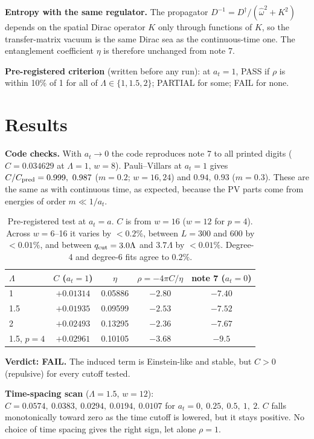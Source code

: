 \documentclass[11pt]{article}
\begin{document}
\textbf{Entropy with the same regulator.} The propagator $D^{-1}=D^\dagger/(\hat\omega^2+K^2)$ depends on the spatial Dirac operator $K$ only through functions of $K$, so the transfer-matrix vacuum is the same Dirac sea as the continuous-time one. The entanglement coefficient $\eta$ is therefore unchanged from note 7.

\textbf{Pre-registered criterion} (written before any run): at $a_t=1$, PASS if $\rho$ is within 10\% of 1 for all of $\Lambda\in\{1,1.5,2\}$; PARTIAL for some; FAIL for none.

\section{Results}
\textbf{Code checks.} With $a_t\to0$ the code reproduces note 7 to all printed digits ($C=0.034629$ at $\Lambda=1$, $w=8$). Pauli--Villars at $a_t=1$ gives $C/C_{\rm pred}=0.999,\ 0.987$ ($m=0.2$; $w=16,24$) and $0.94,\ 0.93$ ($m=0.3$). These are the same as with continuous time, as expected, because the PV parts come from energies of order $m\ll 1/a_t$.

\begin{table}[h]\centering
\begin{tabular}{lcccc}\toprule
$\Lambda$ & $C$ ($a_t=1$) & $\eta$ & $\rho=-4\pi C/\eta$ & note 7 ($a_t=0$)\\\midrule
1 & $+0.01314$ & 0.05886 & $-2.80$ & $-7.40$\\
1.5 & $+0.01935$ & 0.09599 & $-2.53$ & $-7.52$\\
2 & $+0.02493$ & 0.13295 & $-2.36$ & $-7.67$\\
1.5, $p=4$ & $+0.02961$ & 0.10105 & $-3.68$ & $-9.5$\\\bottomrule
\end{tabular}
\caption{Pre-registered test at $a_t=a$. $C$ is from $w=16$ ($w=12$ for $p=4$). Across $w=6$--16 it varies by $<0.2\%$, between $L=300$ and $600$ by $<0.01\%$, and between $q_{\rm cut}=3.0\Lambda$ and $3.7\Lambda$ by $<0.01\%$. Degree-4 and degree-6 fits agree to $0.2\%$.}
\end{table}

\textbf{Verdict: FAIL.} The induced term is Einstein-like and stable, but $C>0$ (repulsive) for every cutoff tested.

\textbf{Time-spacing scan} ($\Lambda=1.5$, $w=12$): $C=0.0574,\ 0.0383,\ 0.0294,\ 0.0194,\ 0.0107$ for $a_t=0,\ 0.25,\ 0.5,\ 1,\ 2$. $C$ falls monotonically toward zero as the time cutoff is lowered, but it stays positive. No choice of time spacing gives the right sign, let alone $\rho=1$.
\end{document}
